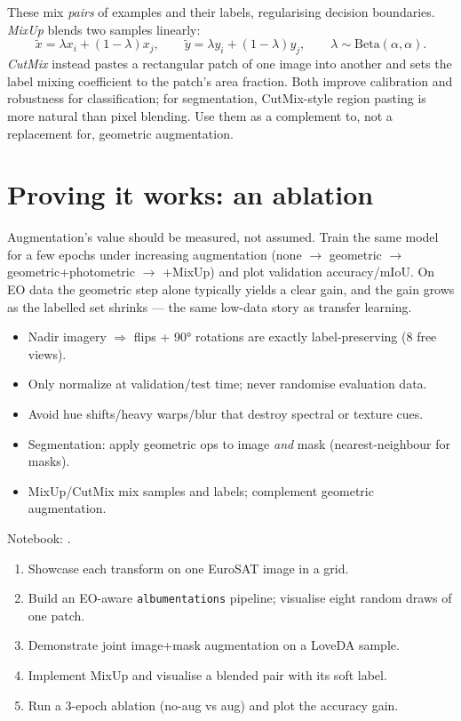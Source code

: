 These mix \emph{pairs} of examples and their labels, regularising decision
boundaries. \emph{MixUp} blends two samples linearly:
\begin{equation}
\tilde{x} = \lambda x_i + (1-\lambda) x_j, \qquad
\tilde{y} = \lambda y_i + (1-\lambda) y_j, \qquad \lambda\sim\mathrm{Beta}(\alpha,\alpha).
\end{equation}
\emph{CutMix} instead pastes a rectangular patch of one image into another and
sets the label mixing coefficient to the patch's area fraction. Both improve
calibration and robustness for classification; for segmentation, CutMix-style
region pasting is more natural than pixel blending. Use them as a complement to,
not a replacement for, geometric augmentation.

\section{Proving it works: an ablation}

Augmentation's value should be measured, not assumed. Train the same model for a
few epochs under increasing augmentation (none $\to$ geometric $\to$
geometric+photometric $\to$ +MixUp) and plot validation accuracy/mIoU. On EO
data the geometric step alone typically yields a clear gain, and the gain grows
as the labelled set shrinks --- the same low-data story as transfer learning.

\begin{keybox}
\begin{itemize}[leftmargin=1.2em,nosep]
  \item Nadir imagery $\Rightarrow$ flips + 90° rotations are exactly label-preserving (8 free views).
  \item Only normalize at validation/test time; never randomise evaluation data.
  \item Avoid hue shifts/heavy warps/blur that destroy spectral or texture cues.
  \item Segmentation: apply geometric ops to image \emph{and} mask (nearest-neighbour for masks).
  \item MixUp/CutMix mix samples and labels; complement geometric augmentation.
\end{itemize}
\end{keybox}

\begin{practbox}
Notebook: .
\begin{enumerate}[leftmargin=1.4em,nosep]
  \item Showcase each transform on one EuroSAT image in a grid.
  \item Build an EO-aware \texttt{albumentations} pipeline; visualise eight random
  draws of one patch.
  \item Demonstrate joint image+mask augmentation on a LoveDA sample.
  \item Implement MixUp and visualise a blended pair with its soft label.
  \item Run a 3-epoch ablation (no-aug vs aug) and plot the accuracy gain.
\end{enumerate}
\end{practbox}

